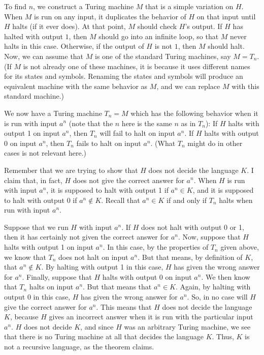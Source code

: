 To find $n$, we construct a Turing machine $M$ that is a simple
variation on $H$.  When $M$ is run on any input, it duplicates the behavior
of $H$ on that input until $H$ halts (if it ever does).  At that point, $M$ should
check $H$'s output.  If $H$ has halted with output $1$, then 
$M$ should go into an infinite loop, so that $M$ never halts in this case.
Otherwise, if the output of $H$ is not $1$, then $M$ should halt.
Now, we can assume that $M$ is one
of the standard Turing machines, say $M=T_n$.  (If $M$ is not
already one of these machines, it is because it uses different names
for its states and symbols.  Renaming the states and symbols will
produce an equivalent machine with the same behavior as $M$,
and we can replace $M$ with this standard machine.)  

We now have a Turing machine $T_n = M$ which has the following behavior
when it is run with input $a^n$ (note that the $n$ here is the same $n$ as
in $T_n$):
If $H$ halts with output 1 on input $a^n$, then $T_n$
will fail to halt on input $a^n$.  If $H$ halts with output 0
on input $a^n$, then $T_n$ fails to halt on input $a^n$.  (What $T_n$
might do in other cases is not relevant here.)

Remember that we are trying to show that $H$ does not decide the language
$K$.  I claim that, in fact, $H$ does not give the correct answer for $a^n$.  When $H$
is run with input $a^n$, it is supposed to halt with output 1 if $a^n\in K$,
and it is supposed to halt with output 0 if $a^n\not\in K$.  Recall that
$a^n\in K$ if and only if $T_n$ halts when run with input $a^n$.

Suppose that we run $H$ with input $a^n$.
If $H$ does not halt with output 0 or 1, then it has certainly not given the 
correct answer for $a^n$.  Now, suppose that $H$ halts with output 1 on input $a^n$.
In this case, by the properties of $T_n$ given above, we know that $T_n$ does not
halt on input $a^n$.  But that means, by definition of $K$, 
that $a^n\not\in K$.  By halting with output
1 in this case, $H$ has given the wrong answer for $a^n$.  Finally, suppose that
$H$ halts with output 0 on input $a^n$.  We then know that $T_n$ halts
on input $a^n$.  But that means that $a^n\in K$.  Again, by halting with output
0 in this case, $H$ has given the wrong answer for $a^n$.  So, in no case will
$H$ give the correct answer for $a^n$.  
This means that
$H$ does not decide the language $K$, because $H$ gives
an incorrect answer when it is run with the particular input $a^n$.
$H$ does not decide $K$, and since
$H$ was an arbitrary Turing machine, we see that there is
no Turing machine at all that decides the language $K$.  Thus,
$K$ is not a recursive language, as the theorem claims. 

